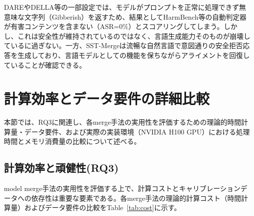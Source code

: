 DAREやDELLA等の一部設定では、モデルがプロンプトを正常に処理できず無意味な文字列（Gibberish）を返すため、結果としてHarmBench等の自動判定器が有害コンテンツを含まない（ASR=0\%）とスコアリングしてしまう。しかし、これは安全性が維持されているのではなく、言語生成能力そのものが崩壊しているに過ぎない。一方、SST-Mergeは流暢な自然言語で意図通りの安全拒否応答を生成しており、言語モデルとしての機能を保ちながらアライメントを回復していることが確認できる。



\section{計算効率とデータ要件の詳細比較}
\label{app:efficiency}
本節では、RQ3に関連し、各merge手法の実用性を評価するための理論的時間計算量・データ要件、および実際の実装環境（NVIDIA H100 GPU）における処理時間とメモリ消費量の比較について述べる。

\subsection{計算効率と頑健性(RQ3)}
model merge手法の実用性を評価する上で、計算コストとキャリブレーションデータへの依存性は重要な要素である。各merge手法の理論的計算コスト（時間計算量）およびデータ要件の比較をTable~\ref{tab:cost}に示す。

